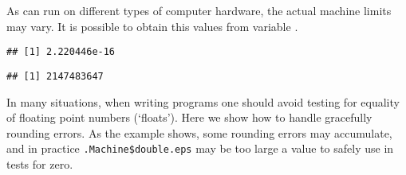 \documentclass[paper=a4,headsepline,BCOR=12mm,twoside,open=right,%
titlepage,headings=small,fontsize=10pt,index=totoc,bibliography=totoc,%
captions=tableheading,captions=nooneline]{scrbook}\usepackage{knitr}
\begin{document}
As \R can run on different types of computer hardware, the actual machine limits may vary. It is possible to obtain this values from variable .

\begin{knitrout}\footnotesize
{}\color{fgcolor}\begin{kframe}
\begin{alltt}
\hlopt{$}
\end{alltt}
\begin{verbatim}
## [1] 2.220446e-16
\end{verbatim}
\begin{alltt}
\hlopt{$}
\end{alltt}
\begin{verbatim}
## [1] 2147483647
\end{verbatim}
\end{kframe}
\end{knitrout}

In many situations, when writing programs one should avoid testing for equality of floating point numbers (`floats'). Here we show how to handle gracefully rounding errors. As the example shows, some rounding errors may accumulate, and in practice \verb|.Machine$double.eps| may be too large a value to safely use in tests for zero.
\end{document}
